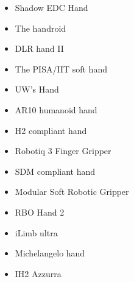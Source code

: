 \documentclass[a4paper, 10pt, conference]{ieeeconf}      %
\begin{document}
\begin{itemize}
\begin{itemize}
	\end{itemize}
\item Shadow EDC Hand
\item The handroid
\item DLR hand II
\item The PISA/IIT soft hand
\item UW’s Hand
\item AR10 humanoid hand
\item H2 compliant hand
\item Robotiq 3 Finger Gripper
\item SDM compliant hand
\item Modular Soft Robotic Gripper
\item RBO Hand 2
\item iLimb ultra
\item Michelangelo hand
\item IH2 Azzurra
\end{itemize}
\end{document}
